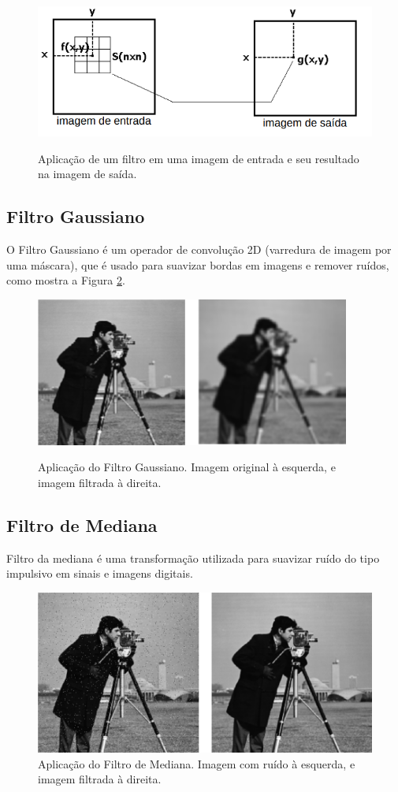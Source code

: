 \begin{figure}[H]
    \centering
    \caption{Aplicação de um filtro em uma imagem de entrada e seu resultado na imagem de saída.}
    \includegraphics[scale=0.4]{dados/figuras/image_filters.png}
    \label{fig:image_filter}
\end{figure}


\subsection{Filtro Gaussiano}
\label{sec:gaussian_filter}

O Filtro Gaussiano é um operador de convolução 2D (varredura de imagem por uma máscara), que é usado para suavizar bordas em imagens e remover ruídos, como mostra a Figura \ref{fig:gaussian_filter}.

\begin{figure}[H]
    \centering
    \caption{Aplicação do Filtro Gaussiano. Imagem original à esquerda, e imagem filtrada à direita.}
    \includegraphics[scale=0.8]{dados/figuras/image_gaussian_filter.png}
    \label{fig:gaussian_filter}    
\end{figure}

\subsection{Filtro de Mediana}
\label{sec:median_filter}

Filtro da mediana é uma transformação utilizada para suavizar ruído do tipo impulsivo em sinais e imagens digitais.

\begin{figure}[H]
    \centering
    \caption{Aplicação do Filtro de Mediana. Imagem com ruído à esquerda, e imagem filtrada à direita.}
    \includegraphics[scale=0.45]{dados/figuras/image_median_filter.png}    
\end{figure}

\fi